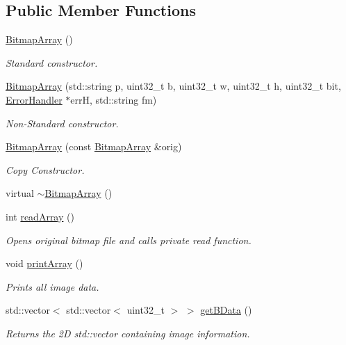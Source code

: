 \subsection*{Public Member Functions}
\begin{DoxyCompactItemize}
\item 
\mbox{\hyperlink{classBitmapArray_a582e5e54ec078d30fde87ae7b4540f32}{Bitmap\+Array}} ()
\begin{DoxyCompactList}\small\item\em Standard constructor. \end{DoxyCompactList}\item 
\mbox{\hyperlink{classBitmapArray_ae11059a1f2f1af199d0a2cf6f316397d}{Bitmap\+Array}} (std\+::string p, uint32\+\_\+t b, uint32\+\_\+t w, uint32\+\_\+t h, uint32\+\_\+t bit, \mbox{\hyperlink{classErrorHandler}{Error\+Handler}} $\ast$errH, std\+::string fm)
\begin{DoxyCompactList}\small\item\em Non-\/\+Standard constructor. \end{DoxyCompactList}\item 
\mbox{\hyperlink{classBitmapArray_a07ce0273af824a8deff592ef1a43d7e5}{Bitmap\+Array}} (const \mbox{\hyperlink{classBitmapArray}{Bitmap\+Array}} \&orig)
\begin{DoxyCompactList}\small\item\em Copy Constructor. \end{DoxyCompactList}\item 
virtual \mbox{\hyperlink{classBitmapArray_acc21c3148de08fb85d2939821f9f2cf0}{$\sim$\+Bitmap\+Array}} ()
\item 
int \mbox{\hyperlink{classBitmapArray_a4ce4b5acc896040075be63a559799e7e}{read\+Array}} ()
\begin{DoxyCompactList}\small\item\em Opens original bitmap file and calls private read function. \end{DoxyCompactList}\item 
void \mbox{\hyperlink{classBitmapArray_a0580ddeedca7f59fd8d43ec92e6bb4a1}{print\+Array}} ()
\begin{DoxyCompactList}\small\item\em Prints all image data. \end{DoxyCompactList}\item 
std\+::vector$<$ std\+::vector$<$ uint32\+\_\+t $>$ $>$ \mbox{\hyperlink{classBitmapArray_a66bd389c357de601df924569a0b38429}{get\+B\+Data}} ()
\begin{DoxyCompactList}\small\item\em Returns the 2D std\+::vector containing image information. \end{DoxyCompactList}\item 

\end{DoxyCompactItemize}

